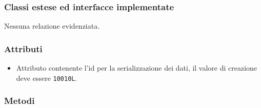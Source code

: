 \subsubsection*{Classi estese ed interfacce implementate}

Nessuna relazione evidenziata.

\subsubsection*{Attributi}

\begin{itemize}
	\item{}
	Attributo contenente l'id per la serializzazione dei dati, il valore di creazione deve essere \texttt{10010L}.
\end{itemize}

\subsubsection*{Metodi}


